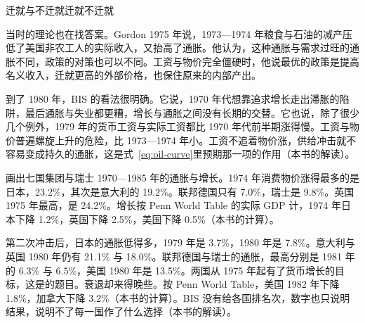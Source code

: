 \begin{compare}{迁就与不迁就}{迁就}{不迁就}
\end{compare}

当时的理论也在找答案。Gordon 1975 年说，1973—1974 年粮食与石油的减产压低了美国非农工人的实际收入，又抬高了通胀\cite{gordon1975}。他认为，这种通胀与需求过旺的通胀不同，政策的对策也可以不同\cite{gordon1975}。工资与物价完全僵硬时，他说最优的政策是提高名义收入，迁就更高的外部价格，也保住原来的内部产出\cite{gordon1975}。

到了 1980 年，BIS 的看法很明确。它说，1970 年代想靠追求增长走出滞胀的陷阱，最后通胀与失业都更糟，增长与通胀之间没有长期的交替\cite{bis1980}。它也说，除了很少几个例外，1979 年的货币工资与实际工资都比 1970 年代前半期涨得慢\cite{bis1980}。工资与物价普遍螺旋上升的危险，比 1973—1974 年小\cite{bis1980}。工资不追着物价涨，供给冲击就不容易变成持久的通胀，这是式~\eqref{eq:oil-curve}里预期那一项的作用（本书的解读）。

画出七国集团与瑞士 1970—1985 年的通胀与增长。1974 年消费物价涨得最多的是日本，23.2\%，其次是意大利的 19.2\%\cite{wdi47}。联邦德国只有 7.0\%，瑞士是 9.8\%\cite{wdi47}。英国 1975 年最高，是 24.2\%\cite{wdi47}。增长按 Penn World Table 的实际 GDP 计，1974 年日本下降 1.2\%，英国下降 2.5\%，美国下降 0.5\%（本书的计算）\cite{pwt1001}。


第二次冲击后，日本的通胀低得多，1979 年是 3.7\%，1980 年是 7.8\%\cite{wdi47}。意大利与英国 1980 年仍有 21.1\% 与 18.0\%\cite{wdi47}。联邦德国与瑞士的通胀，最高分别是 1981 年的 6.3\% 与 6.5\%，美国 1980 年是 13.5\%\cite{wdi47}。两国从 1975 年起有了货币增长的目标，这是的题目。衰退却来得晚些。按 Penn World Table，美国 1982 年下降 1.8\%，加拿大下降 3.2\%（本书的计算）\cite{pwt1001}。BIS 没有给各国排名次，数字也只说明结果，说明不了每一国作了什么选择（本书的解读）。

